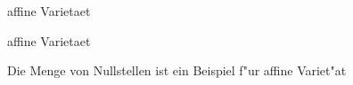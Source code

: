 \documentclass[class=article, crop=false]{standalone}
\begin{document}
\begin{zettel}{affine Varietaet}
\begin{flashcard}[eupxe7tv]{affine Varietaet}
	\begin{definition}
		Die Menge von Nullstellen ist ein Beispiel f"ur affine Variet"at
	\end{definition}
\end{flashcard}
\end{zettel}
\end{document}

